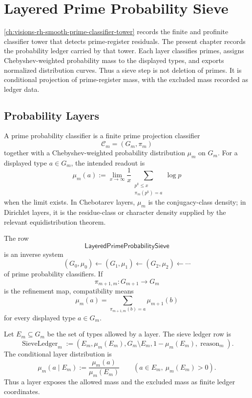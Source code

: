 \chapter{Layered Prime Probability Sieve}
\label{ch:visions-rh-layered-prime-probability-sieve}

\autoref{ch:visions-rh-smooth-prime-classifier-tower} records the finite
and profinite classifier tower that detects prime-register residuals.
The present chapter records the probability ledger carried by that tower.
Each layer classifies primes, assigns Chebyshev-weighted probability
mass to the displayed types, and exports normalized distribution curves.
Thus a sieve step is not deletion of primes.  It is conditional
projection of prime-register mass, with the excluded mass recorded as
ledger data.

\section{Probability Layers}
\label{sec:rh-layered-prime-probability-layers}

\begin{definition}
\label{def:rh-prime-probability-classifier}
A prime probability classifier is a finite prime projection classifier
$$
\mathcal C_m=(G_m,\pi_m)
$$
together with a Chebyshev-weighted probability distribution $\mu_m$ on
$G_m$.  For a displayed type $a\in G_m$, the intended readout is
$$
\mu_m(a)
:=
\lim_{x\to\infty}
\frac1x
\sum_{\substack{p^k\le x\\ \pi_m(p^k)=a}}
\log p
$$
when the limit exists.  In Chebotarev layers, $\mu_m$ is the
conjugacy-class density; in Dirichlet layers, it is the residue-class
or character density supplied by the relevant equidistribution theorem.
\end{definition}

\begin{definition}[LayeredPrimeProbabilitySieve]
\label{def:rh-layered-prime-probability-sieve}
The row
$$
\mathsf{LayeredPrimeProbabilitySieve}
$$
is an inverse system
$$
(G_0,\mu_0)
\leftarrow
(G_1,\mu_1)
\leftarrow
(G_2,\mu_2)
\leftarrow\cdots
$$
of prime probability classifiers.  If
$$
\pi_{m+1,m}:G_{m+1}\to G_m
$$
is the refinement map, compatibility means
$$
\mu_m(a)
=
\sum_{\pi_{m+1,m}(b)=a}\mu_{m+1}(b)
$$
for every displayed type $a\in G_m$.
\end{definition}

\begin{definition}
\label{def:rh-sieve-ledger-row}
Let $E_m\subseteq G_m$ be the set of types allowed by a layer.  The
sieve ledger row is
$$
\operatorname{SieveLedger}_m
:=
\left(E_m,\mu_m(E_m),G_m\setminus E_m,1-\mu_m(E_m),\operatorname{reason}_m\right).
$$
The conditional layer distribution is
$$
\mu_m(a\mid E_m)
:=
\frac{\mu_m(a)}{\mu_m(E_m)}
\qquad
(a\in E_m,\ \mu_m(E_m)>0).
$$
Thus a layer exposes the allowed mass and the excluded mass as finite
ledger coordinates.
\end{definition}

